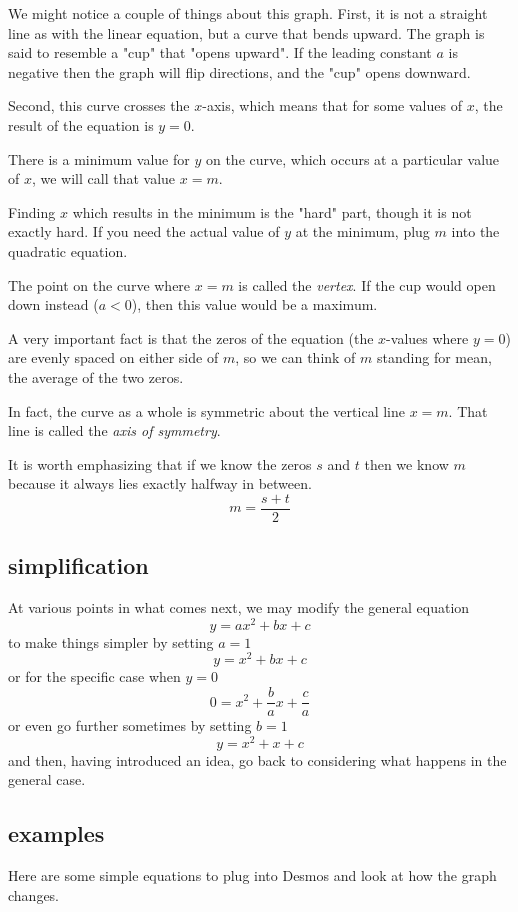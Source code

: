 \documentclass[11pt, oneside]{article}
\begin{document}
We might notice a couple of things about this graph.  First, it is not a straight line as with the linear equation, but a curve that bends upward.  The graph is said to resemble a "cup" that "opens upward".  If the leading constant $a$ is negative then the graph will flip directions, and the "cup" opens downward.

Second, this curve crosses the $x$-axis, which means that for some values of $x$, the result of the equation is $y = 0$.

There is a minimum value for $y$ on the curve, which occurs at a particular value of $x$, we will call that value $x = m$.

Finding $x$ which results in the minimum is the "hard" part, though it is not exactly hard.  If you need the actual value of $y$ at the minimum, plug $m$ into the quadratic equation.

The point on the curve where $x=m$ is called the \emph{vertex}.  If the cup would open down instead ($a < 0$), then this value would be a maximum.

A very important fact is that the zeros of the equation (the $x$-values where $y = 0$) are evenly spaced on either side of $m$, so we can think of $m$ standing for mean, the average of the two zeros.

In fact, the curve as a whole is symmetric about the vertical line $x = m$.  That line is called the \emph{axis of symmetry}.

It is worth emphasizing that if we know the zeros $s$ and $t$ then we know $m$ because it always lies exactly halfway in between.
\[ m = \frac{s + t}{2} \]

\subsection*{simplification}

At various points in what comes next, we may modify the general equation 
\[ y = ax^2 + bx + c \]
to make things simpler by setting $a = 1$
\[ y = x^2 + bx + c \]
or for the specific case when $y = 0$
\[ 0 = x^2 + \frac{b}{a} x + \frac{c}{a} \]
or even go further sometimes by setting $b = 1$
\[ y = x^2 + x + c \]
and then, having introduced an idea, go back to considering what happens in the general case.

\subsection*{examples}
Here are some simple equations to plug into Desmos and look at how the graph changes.
\end{document}
